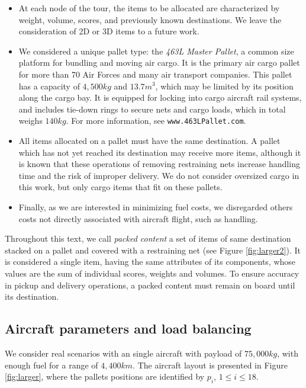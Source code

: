 \documentclass[preprint]{elsarticle}
\begin{document}
\begin{itemize}
	
	\item At each node of the tour, the items to be allocated are characterized by weight, volume, scores, and previously known destinations. We leave the consideration of 2D or 3D items to a future work.
		
	\item We considered a unique pallet type: the {\it 463L Master Pallet}, a common size platform for bundling and moving air cargo. It is the primary air cargo pallet for more than 70 Air Forces and many air transport companies. This pallet has a capacity of $4,500 kg$ and $13.7 m^3$, which may be limited by its position along the cargo bay. It is equipped for locking into cargo aircraft rail systems, and includes tie-down rings to secure nets and cargo loads, which in total weighs $140 kg$. For more information, see {\tt www.463LPallet.com}.
	
	\item All items allocated on a pallet must have the same destination. A pallet which has not yet reached its destination may receive more items, although it is known that these operations of removing restraining nets increase handling time and the risk of improper delivery. We do not consider oversized cargo in this work, but only cargo items that fit on these pallets.
	
	\item Finally, as we are interested in minimizing fuel costs, we disregarded others costs not directly associated with aircraft flight, such as handling.

\end{itemize}

Throughout this text, we call {\it packed content}\/ a set of items of same destination stacked on a pallet and covered with a restraining net (see Figure \ref{fig:larger2}). It is considered a single item, having the same attributes of its components, whose values are the sum of individual scores, weights and volumes. To ensure accuracy in pickup and delivery operations, a packed content must remain on board until its destination.



\subsection{Aircraft parameters and load balancing}


We consider real scenarios with an single aircraft with payload of $75,000 kg$, with enough fuel for a range of $4,400km$. The aircraft layout is presented in Figure \ref{fig:larger}, where the pallets positions are identified by $p_i$, $1\leq i \leq 18$.
\end{document}
